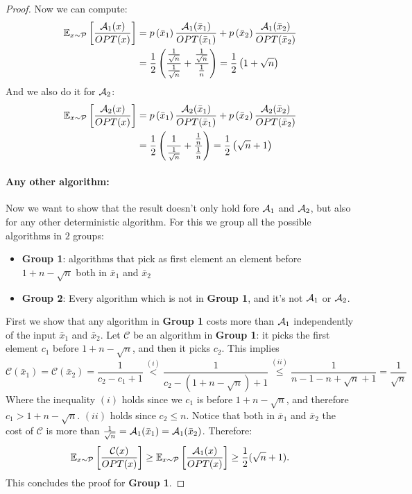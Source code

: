 \documentclass[11pt]{article}
\begin{document}
\begin{enumerate}
\begin{proof}
    Now we can compute:
    \begin{align*}
        \mathbb{E} _{x\sim \mathcal{P}}\left[\frac{\mathcal{A}_1(x)}{OPT(x)}\right] &=  p\left(\bar x_1\right)\frac{\mathcal{A}_1(\bar x_1)}{OPT(\bar x_1)}+ p\left(\bar x_2\right)\frac{\mathcal{A}_1(\bar x_2)}{OPT(\bar x_2)}\\
        &= \frac{1}{2}\left(\frac{\frac{1}{\sqrt{n}}}{\frac{1}{\sqrt{n}}}+ \frac{\frac{1}{\sqrt{n}}}{\frac{1}{n}}\right) = \frac{1}{2}\left(1 + \sqrt{n}\right)
    \end{align*}
    And we also do it for $\mathcal{A}_2$:
    \begin{align*}
        \mathbb{E} _{x\sim \mathcal{P}}\left[\frac{\mathcal{A}_2(x)}{OPT(x)}\right] &=  p\left(\bar x_1\right)\frac{\mathcal{A}_2(\bar x_1)}{OPT(\bar x_1)}+ p\left(\bar x_2\right)\frac{\mathcal{A}_2(\bar x_2)}{OPT(\bar x_2)}\\
        &= \frac{1}{2}\left(\frac{1}{\frac{1}{\sqrt{n}}}+ \frac{\frac{1}{{n}}}{\frac{1}{n}}\right) = \frac{1}{2}\left(\sqrt{n} + 1\right)
    \end{align*}
    \paragraph{Any other algorithm: } Now we want to show that the result doesn't only hold fore $\mathcal{A}_1$ and $\mathcal{A}_2$, but also for any other deterministic algorithm. For this we group all the possible algorithms in $2$ groups:
    \begin{itemize}
        \item \textbf{Group 1}: algorithms that pick as first element an element before $1 + n - \sqrt{n}$ both in $\bar x_1$ and $\bar x_2$
        \item \textbf{Group 2}: Every algorithm which is not in \textbf{Group 1}, and it's not $\mathcal{A}_1$ or $\mathcal{A}_2$.
    \end{itemize}
    First we show that any algorithm in \textbf{Group 1} costs more than $\mathcal{A}_1$ independently of the input $\bar x_1$ and $\bar x_2$. Let $\mathcal C$ be an algorithm in \textbf{Group 1}: it picks the first element $c_1$ before $1 + n - \sqrt{n}$, and then it picks $c_2$. This implies
    \begin{equation*}
        \mathcal C(\bar x _ 1) = \mathcal C(\bar x _ 2) = \frac{1}{c_2-c_1+1}  \stackrel{(i)}{<} \frac{1}{c_2 - (1 + n - \sqrt{n}) +1} \stackrel{(ii)}{\leq} \frac{1}{n - 1 - n + \sqrt{n} +1} = \frac{1}{\sqrt{n}}
    \end{equation*}
    Where the inequality $(i)$ holds since we $c_1$ is before $1 + n - \sqrt{n}$, and therefore $c_1 > 1 + n - \sqrt{n}$. $(ii)$ holds since $c_2 \leq n$. Notice that both in $\bar x_1$ and $\bar x_2$ the cost of $\mathcal{C}$ is more than $\frac{1}{\sqrt{n}} = \mathcal{A}_1(\bar x_1) =\mathcal{A}_1(\bar x_2)$. Therefore: 
    \begin{equation*}
        \mathbb{E} _{x\sim \mathcal{P}}\left[\frac{\mathcal{C}(x)}{OPT(x)}\right] \geq \mathbb{E} _{x\sim \mathcal{P}}\left[\frac{\mathcal{A}_1(x)}{OPT(x)}\right] \geq \frac{1}{2}(\sqrt{n} + 1).
    \end{equation*} This concludes the proof for \textbf{Group 1}.


\end{proof}
\end{enumerate}
\end{document}
